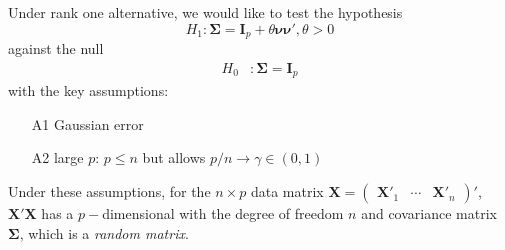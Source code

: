 \documentclass[twoside]{article}
\begin{document}
Under rank one alternative, we would like to test the hypothesis
$$
H_1: \boldsymbol{\Sigma} = \mathbf{I}_p+ \theta\boldsymbol{\nu}\boldsymbol{\nu}', \theta>0
$$
against the null
\begin{align*}
    H_0 &: \boldsymbol{\Sigma}= \mathbf{I}_p
\end{align*}
with the key assumptions:
\begin{itemize}
    \item[A1] Gaussian error
    \item[A2] large $p$: $p\leq n$ but allows $p/n \rightarrow \gamma \in (0,1)$ 
\end{itemize}
Under these assumptions, for the $n\times p$ data matrix $\mathbf{X} = \begin{pmatrix}
    \mathbf{X}'_1 &\cdots & \mathbf{X}'_n
\end{pmatrix}'$, $\mathbf{X}'\mathbf{X}$ has a $p-$dimensional  with the degree of freedom $n$ and covariance matrix $\boldsymbol{\Sigma}$, which is a \textit{random matrix}.
\end{document}
